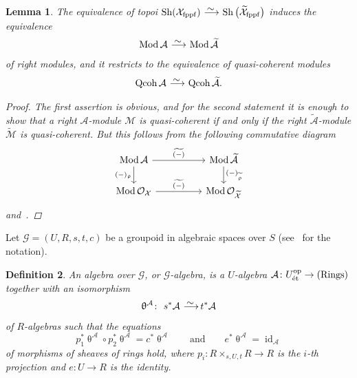\documentclass[pdftex]{sigma}%
\newtheorem{dfn}{Definition}[section]
\newtheorem{lem}[dfn]{Lemma}
\numberwithin{equation}{section}
\newcommand{\Qcoh}{\operatorname{Qcoh}}
\newcommand{\Mod}{\operatorname{Mod}}
\newcommand{\id}{\operatorname{id}}
\newcommand{\fppf}{\operatorname{fppf}}
\newcommand{\Rings}{\operatorname{Rings}}
\newcommand{\op}{\operatorname{op}}
\newcommand{\Sh}{\operatorname{Sh}}
\newcommand{\et}{\text{\rm \'et}}
\newcommand{\cA}{\mathcal{A}}
\newcommand{\cG}{\mathcal{G}}
\newcommand{\cM}{\mathcal{M}}
\newcommand{\cO}{\mathcal{O}}
\newcommand{\cX}{\mathcal{X}}
\newcommand{\simto}{\,\,\,\,\raisebox{4pt}{$\sim$}{\kern -1.1em \longrightarrow}\,}
\begin{document}
\begin{lem}\label{stackification equiv}
The equivalence of topoi $\Sh(\cX_{\fppf})\simto \Sh\big(\widetilde{\cX}_{\fppf}\big)$ induces the equivalence
\begin{gather*}
\Mod\cA\simto \Mod\widetilde{\cA}
\end{gather*}
of right modules, and it restricts to the equivalence of quasi-coherent modules
\begin{gather*}
\Qcoh\cA\simto \Qcoh\widetilde{\cA}.
\end{gather*}
\begin{proof}
The first assertion is obvious, and for the second statement it is enough to show that a right $\cA$-module $\cM$ is quasi-coherent if and only if the right $\widetilde{\cA}$-module $\widetilde{\cM}$ is quasi-coherent. But this follows from the following commutative diagram
\[
\begin{tikzcd}
\Mod\cA\arrow[rr,"\widetilde{(-)}"]\arrow[d,"(-)_{\uprho}"']&&\Mod\widetilde{\cA}\arrow[d," (-)_{\widetilde{\uprho}}"]\\
\Mod\cO_{\cX}\arrow[rr, "\widetilde{(-)}"]&&\Mod\cO_{\widetilde{\cX}}
\end{tikzcd}
\]
and~\cite[Lemma~12.2; 06WR]{stacks}.
\end{proof}
\end{lem}


Let $\cG=(U,R,s,t, c)$ be a groupoid in algebraic spaces over $S$ (see~\cite[Definition 11.1; 043W]{stacks} for the notation).


\begin{dfn}
 An {\it algebra over $\cG$}, or {\it $\cG$-algebra}, is a $U$-algebra $\cA\colon U_{\et}^{\op}\to (\Rings)$ together with an isomorphism
\begin{gather*}
\uptheta^{\cA}\colon\ s^*\cA\simto t^*\cA
\end{gather*}
of $R$-algebras such that the equations
\begin{equation}\label{groupoid alg}
p_1^*\uptheta^{\cA}\circ p_2^*\uptheta^{\cA}=c^*\uptheta^{\cA}
\qquad\text{and}\qquad
e^*\uptheta^{\cA}=\id_{\cA}
\end{equation}
of morphisms of sheaves of rings hold, where $p_i\colon R\times_{s,U,t}R \to R$ is the $i$-th projection and $e\colon U\to R$ is the identity.
\end{dfn}
\end{document}
